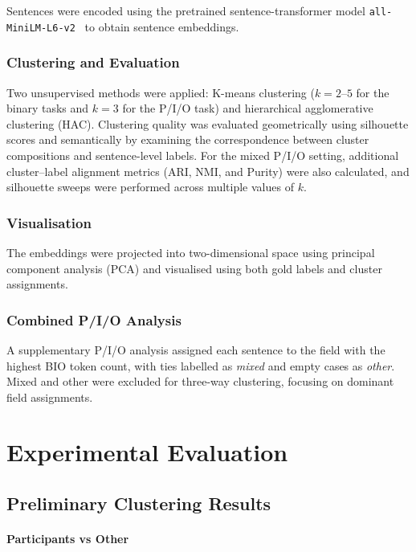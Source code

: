 \documentclass[11pt]{article}
\begin{document}
Sentences were encoded using the pretrained sentence-transformer model \texttt{all-MiniLM-L6-v2}~\cite{reimers-2019-sentence-bert} to obtain sentence embeddings.

\subsubsection{Clustering and Evaluation}

Two unsupervised methods were applied: K-means clustering ($k = 2$--$5$ for the binary tasks and $k = 3$ for the P/I/O task) and hierarchical agglomerative clustering (HAC). Clustering quality was evaluated geometrically using silhouette scores and semantically by examining the correspondence between cluster compositions and sentence-level labels. For the mixed P/I/O setting, additional cluster--label alignment metrics (ARI, NMI, and Purity) were also calculated, and silhouette sweeps were performed across multiple values of $k$.

\subsubsection{Visualisation}

The embeddings were projected into two-dimensional space using principal component analysis (PCA) and visualised using both gold labels and cluster assignments.

\subsubsection{Combined P/I/O Analysis}

A supplementary P/I/O analysis assigned each sentence to the field with the highest BIO token count, with ties labelled as \textit{mixed} and empty cases as \textit{other}. Mixed and other were excluded for three-way clustering, focusing on dominant field assignments.

\section{Experimental Evaluation}

\subsection{Preliminary Clustering Results}

\paragraph{Participants vs Other}
\end{document}

